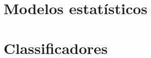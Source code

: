 \chapter{Modelos estatísticos}


\chapter{Classificadores}


\begin{comment}
 1 - Primeiro podemos começar definindo conceitos básicos como categoria, modelo de dados, e 
 quais modelos alternativos ao bayer existem, e porquê utilizamos o bayer.
 
 Definir como um modelo de dados é construido, isso implica em abordar os conceitos estatísticos visto
 nas vídeo aulas do youtube.

 Definir como algorítmo de bayer utiliza o modelo de dados.
\end{comment}
